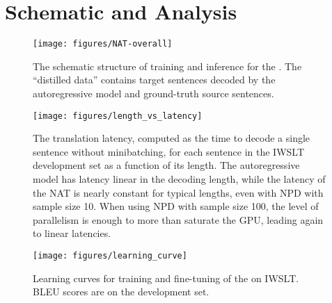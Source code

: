 \documentclass{article} \usepackage{iclr2018_conference,times}
\begin{document}




\newpage
\appendix
\section{Schematic and Analysis}


\begin{figure}[htbp]
\centering
\texttt{[image: figures/NAT-overall]}
\caption{The schematic structure of training and inference for the \model. The ``distilled data'' contains target sentences decoded by the autoregressive model and ground-truth source sentences.}
\end{figure}

\begin{figure}[htbp]
\centering
\texttt{[image: figures/length\_vs\_latency]}
\caption{The translation latency, computed as the time to decode a single sentence without minibatching, for each sentence in the IWSLT development set as a function of its length. The autoregressive model has latency linear in the decoding length, while the latency of the NAT is nearly constant for typical lengths, even with NPD with sample size 10. When using NPD with sample size 100, the level of parallelism is enough to more than saturate the GPU, leading again to linear latencies.}
\end{figure}

\begin{figure}[htbp]
\centering
\texttt{[image: figures/learning\_curve]}
\caption{Learning curves for training and fine-tuning of the \model{} on IWSLT. BLEU scores are on the development set.}
\end{figure}
\end{document}
